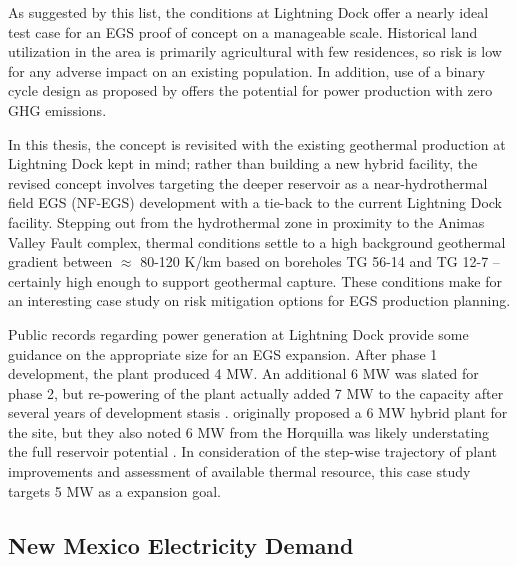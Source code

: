 As suggested by this list, the conditions at Lightning Dock offer a nearly ideal test case for an EGS proof of concept on a manageable scale. Historical land utilization in the area is primarily agricultural with few residences, so risk is low for any adverse impact on an existing population. In addition, use of a binary cycle design as proposed by \citet{schochet_development_2001} offers the potential for power production with zero GHG emissions.  

In this thesis, the \citeauthor{schochet_development_2001} concept is revisited with the existing geothermal production at Lightning Dock kept in mind; rather than building a new hybrid facility, the revised concept involves targeting the deeper reservoir as a near-hydrothermal field EGS (NF-EGS) development with a tie-back to the current Lightning Dock facility. Stepping out from the hydrothermal zone in proximity to the Animas Valley Fault complex, thermal conditions settle to a high background geothermal gradient between $\approx$ 80-120 K/km based on boreholes TG 56-14 and TG 12-7 \citep{cunniff_final_2003} -- certainly high enough to support geothermal capture. These conditions make for an interesting case study on risk mitigation options for EGS production planning.

Public records regarding power generation at Lightning Dock provide some guidance on the appropriate size for an EGS expansion. After phase 1 development, the plant produced 4 MW. An additional 6 MW was slated for phase 2, but re-powering of the plant actually added 7 MW to the capacity after several years of development stasis \citep{think_geoenergy_turboden_2020}. \citeauthor{schochet_development_2001} originally proposed a 6 MW hybrid plant for the site, but they also noted 6 MW from the Horquilla was likely understating the full reservoir potential \citeyear{schochet_development_2001}. In consideration of the step-wise trajectory of plant improvements and assessment of available thermal resource, this case study targets 5 MW as a expansion goal. 

\subsection{New Mexico Electricity Demand}

